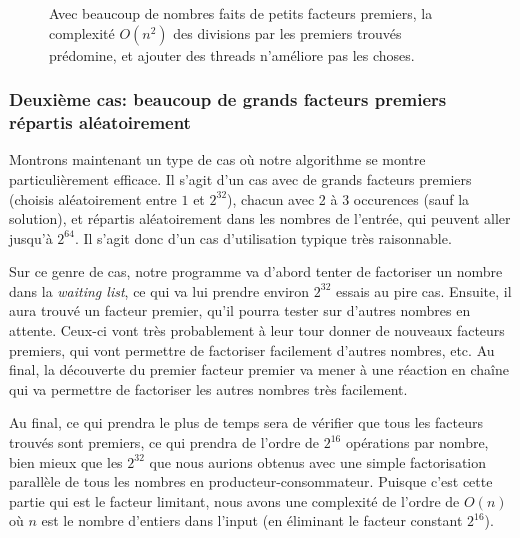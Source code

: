 \documentclass[a4paper,10pt]{article}
\begin{document}
\begin{figure}[t!]
    \centering
    \caption{Avec beaucoup de nombres faits de petits facteurs premiers, la complexité $O(n^2)$ des divisions par les premiers trouvés prédomine, et ajouter des threads n'améliore pas les choses.}
    \label{fig:many-small-primes}
\end{figure}

\newpage
\subsubsection*{Deuxième cas: beaucoup de grands facteurs premiers répartis aléatoirement}

Montrons maintenant un type de cas où notre algorithme se montre particulièrement efficace. Il s'agit d'un cas avec de grands facteurs premiers (choisis aléatoirement entre $1$ et $2^{32}$), chacun avec 2 à 3 occurences (sauf la solution), et répartis aléatoirement dans les nombres de l'entrée, qui peuvent aller jusqu'à $2^{64}$. Il s'agit donc d'un cas d'utilisation typique très raisonnable.

Sur ce genre de cas, notre programme va d'abord tenter de factoriser un nombre dans la \emph{waiting list}, ce qui va lui prendre environ $2^{32}$ essais au pire cas. Ensuite, il aura trouvé un facteur premier, qu'il pourra tester sur d'autres nombres en attente. Ceux-ci vont très probablement à leur tour donner de nouveaux facteurs premiers, qui vont permettre de factoriser facilement d'autres nombres, etc. Au final, la découverte du premier facteur premier va mener à une réaction en chaîne qui va permettre de factoriser les autres nombres très facilement.

Au final, ce qui prendra le plus de temps sera de vérifier que tous les facteurs trouvés sont premiers, ce qui prendra de l'ordre de $2^{16}$ opérations par nombre, bien mieux que les $2^{32}$ que nous aurions obtenus avec une simple factorisation parallèle de tous les nombres en producteur-consommateur. Puisque c'est cette partie qui est le facteur limitant, nous avons une complexité de l'ordre de $O(n)$ où $n$ est le nombre d'entiers dans l'input (en éliminant le facteur constant $2^{16}$).
\end{document}
